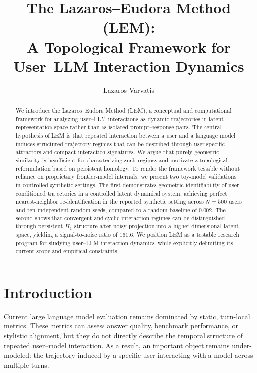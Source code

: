 \documentclass[11pt]{article}
\title{The Lazaros--Eudora Method (LEM):\\
A Topological Framework for User--LLM Interaction Dynamics}
\author{Lazaros Varvatis}
\date{}
\begin{document}
\maketitle


\begin{abstract}
We introduce the Lazaros--Eudora Method (LEM), a conceptual
and computational framework for analyzing user--LLM
interactions as dynamic trajectories in latent representation
space rather than as isolated prompt--response pairs. The
central hypothesis of LEM is that repeated interaction
between a user and a language model induces structured
trajectory regimes that can be described through
user-specific attractors and compact interaction signatures.
We argue that purely geometric similarity is insufficient for
characterizing such regimes and motivate a topological
reformulation based on persistent homology. To render the
framework testable without reliance on proprietary
frontier-model internals, we present two toy-model
validations in controlled synthetic settings. The first
demonstrates geometric identifiability of user-conditioned
trajectories in a controlled latent dynamical system,
achieving perfect nearest-neighbor re-identification in the
reported synthetic setting across $N{=}500$ users and ten
independent random seeds, compared to a random baseline of
$0.002$. The second shows that convergent and cyclic
interaction regimes can be distinguished through persistent
$H_1$ structure after noisy projection into a
higher-dimensional latent space, yielding a
signal-to-noise ratio of $161.6$. We position LEM as a
testable research program for studying user--LLM interaction
dynamics, while explicitly delimiting its current scope and
empirical constraints.
\end{abstract}


\section{Introduction}

Current large language model evaluation remains dominated by
static, turn-local metrics. These metrics can assess answer
quality, benchmark performance, or stylistic alignment, but
they do not directly describe the temporal structure of
repeated user--model interaction. As a result, an important
object remains under-modeled: the trajectory induced by a
specific user interacting with a model across multiple turns.
\end{document}
